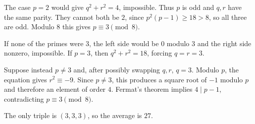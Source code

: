 The case $p=2$ would give $q^2+r^2=4$, impossible. Thus $p$ is odd and $q,r$ have the same parity. They cannot both be $2$, since $p^2(p-1)\ge18>8$, so all three are odd. Modulo $8$ this gives $p\equiv3\pmod8$.

If none of the primes were $3$, the left side would be $0$ modulo $3$ and the right side nonzero, impossible. If $p=3$, then $q^2+r^2=18$, forcing $q=r=3$.

Suppose instead $p\ne3$ and, after possibly swapping $q,r$, $q=3$. Modulo $p$, the equation gives $r^2\equiv-9$. Since $p\ne3$, this produces a square root of $-1$ modulo $p$ and therefore an element of order $4$. Fermat's theorem implies $4\mid p-1$, contradicting $p\equiv3\pmod8$.

The only triple is $(3,3,3)$, so the average is $\boxed{27}$.
